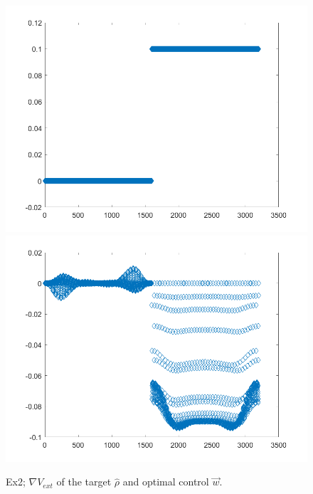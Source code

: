 \documentclass[final]{siamltex}
\newcommand{\w}{\vec{w}}
\newcommand{\hr}{\widehat \rho}
\begin{document}
\begin{figure}[h]
	\centering
	\includegraphics[scale=0.2]{V1.png}
	\includegraphics[scale=0.2]{W1.png}
	\caption{Ex2; $\nabla V_{ext}$ of the target $\hr$ and optimal control $\w$.} 
	\label{F1a}
\end{figure}
\end{document}
